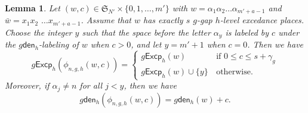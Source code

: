 \documentclass[12pt]{article}
\numberwithin{equation}{section}
\theoremstyle{plain}
\newtheorem{lemma}[theorem]{Lemma}
\def\den{\mathsf{den}}
\def\Excp{\mathsf{Excp}}
\begin{document}
 

\begin{lemma}\label{lem-phi-den1}
Let $(w, c)\in  \mathfrak{S}_{N'}\times  \{0,1, \ldots, m'\}$ with $w=\alpha_1\alpha_2\ldots \alpha_{m'+a-1}$ and  $\bar{w}=x_1x_2$ $\ldots x_{m'+a-1}$. Assume that $w$ has exactly $s$ $g$-gap $h$-level excedance places.
Choose the integer $y$ such that    the space before  the letter  $\alpha_y$ is labeled by $c$  under the   $g\den_h$-labeling  of $w$ when $c>0$,  and let $y=m'+1$ when $c=0$.   Then we have 
\begin{equation}\label{eq-Excp_r}
	g\Excp_h(\phi_{n,g,h}(w, c))=\left\{ \begin{array}{ll}
		g\Excp_h(w)&\, \mathrm{if}\,\,   0\leq c\leq s+\gamma_g  \\
		g\Excp_h(w)\cup \{y\}&\, \mathrm{otherwise}.
	\end{array}
	\right.
\end{equation}
Moreover, 
	if  $\alpha_j\neq n$ for all $j<y$, then we have 
	\begin{equation}\label{eq-den_r}
g\den_h(\phi_{n,g,h}(w, c))=g\den_h(w)+c.
	\end{equation}
	\end{lemma}
\end{document}
